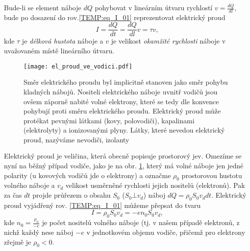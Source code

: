       Bude-li se element náboje $dQ$ pohybovat v lineárním útvaru rychlostí $v = \frac{dQ}{dl}$,
      bude po dosazení do rov.\ref{TEMP:eq_I_01} reprezentovat elektrický proud 
        \begin{equation}\label{TEMP:eq_I_04}
          I = \frac{dQ}{dt} = \frac{dQ}{dl}v = \tau v, 
        \end{equation}      
      kde $\tau$ je \emph{délková hustota} náboje a $v$ je velikost \emph{okamžité rychlosti}
      náboje v uvažovaném místě lineárního útvaru. 

      \begin{figure}[ht!]
         \centering
         \texttt{[image: el\_proud\_ve\_vodici.pdf]}
         \caption[Náboje, pohybující se vodičem]{Směr elektrického proudu byl implicitně stanoven
                  jako směr pohybu kladných nábojů. Nositeli elektrického náboje uvnitř vodičů jsou
                  ovšem záporně nabité volné elektrony, které se tedy dle  konvence pohybují proti
                  směru elektrického proudu. Elektrický proud může protékat pevnými látkami (kovy,
                  polovodiči), kapalinami (elektrolyty) a ionizovanými plyny. Látky, které nevedou
                  elektrický proud, nazýváme nevodiči, izolanty}
         \label{TEMP:fig_el_proud_ve_vodici}
      \end{figure}
      
      Elektrický proud je veličina, která obecně popisuje prostorový jev. Omezíme se nyní na běžný
      případ vodiče, jako je na obr. \ref{TEMP:fig_el_proud_ve_vodici}, který má volné náboje jen
      jedné polarity (u kovových vodičů jde o elektrony) a označme $\rho_0$ prostorovou hustotu
      volného náboje a $v_d$ velikost usměrněné rychlosti jejich nositelů (elektronů). Pak za čas
      $dt$ projde průřezem o obsahu $S_0$ ($S_0\bot v_d$) náboj $dQ = \rho_0 S_0 v_d dt$.
      Elektrický proud vyjádřený rov.
      \ref{TEMP:eq_I_01} můžeme přepsat do tvaru
        \begin{equation}\label{TEMP:eq_I_05}
          I = \rho_0 S_0 v_d = - e n_0 S_0 v_d, 
        \end{equation}         
      kde $\displaystyle{n_0 = \frac{\rho_0}{-e}}$ je počet nositelů volného náboje (tj. v našem
      případě elektronů, z nichž každý nese náboj $-e$ v jednotkovém objemu vodiče, přičemž pro
      elektrony zřejmě je $\rho_0<0$.

